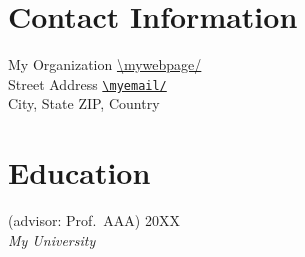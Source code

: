 

\usepackage[backend=biber,style=numeric,sorting=ymddnt,defernumbers=true,hyperref=true,backref=false,maxbibnames=99]{biblatex}  %


\nocite{*}  %

\usepackage{etaremune}
\usepackage{calc}
%
	{\vspace{-9ex}\begin{etaremune}[topsep=0pt,parsep=0pt,partopsep=0pt,itemindent=0pt,leftmargin={\widthof{[99]}}]}%
	{\end{etaremune}}%
	{\item}%


\usepackage[group-separator={,},binary-units,per-mode=symbol]{siunitx}
\DeclareSIUnit{}

\usepackage[dvipsnames]{xcolor}
\usepackage[pdfusetitle,pdfpagelabels,colorlinks=true,allcolors=BrickRed,hypertexnames=true]{hyperref}  %

\usepackage{url}


	\thispagestyle{firstpagestyle}  %

    \section{Contact Information}
	My Organization \hfill \url{\mywebpage/}\\
	Street Address \hfill \href{mailto:\myemail/}{\nolinkurl{\myemail/}}\\
	City, State ZIP, Country
	
    \section{Education}
	 (advisor: Prof.~AAA) \hfill 20XX\\
	\textsl{My University}
	
